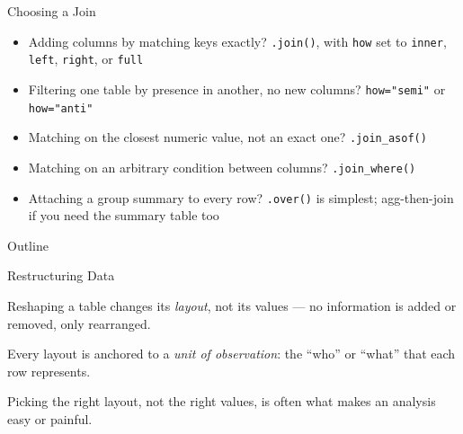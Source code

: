 \documentclass[8pt,aspectratio=169]{beamer}
\begin{document}
\begin{textframe}{Choosing a Join}

\begin{itemize}
\item Adding columns by matching keys exactly? \texttt{.join()}, with \texttt{how} set to \texttt{inner}, \texttt{left}, \texttt{right}, or \texttt{full}
\item Filtering one table by presence in another, no new columns? \texttt{how="semi"} or \texttt{how="anti"}
\item Matching on the closest numeric value, not an exact one? \texttt{.join\_asof()}
\item Matching on an arbitrary condition between columns? \texttt{.join\_where()}
\item Attaching a group summary to every row? \texttt{.over()} is simplest; agg-then-join if you need the summary table too
\end{itemize}

\end{textframe}

\begin{outlineframe}{Outline}
\end{outlineframe}


\begin{textframe}{Restructuring Data}

Reshaping a table changes its \textit{layout}, not its values --- no information is added or removed, only rearranged.

Every layout is anchored to a \textit{unit of observation}: the ``who'' or ``what'' that each row represents.

Picking the right layout, not the right values, is often what makes an analysis easy or painful.

\end{textframe}
\end{document}
